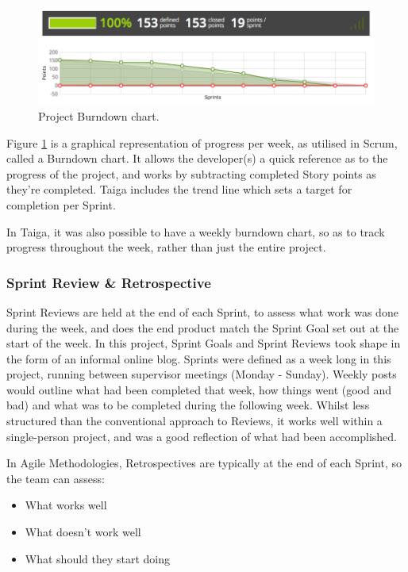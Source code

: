 \begin{figure}[H]
  \centering
  \includegraphics[width=\textwidth]{Chapter2/software-img/burndown.png}
  \caption{Project Burndown chart.}
  \label{fig:burndown}
\end{figure}

Figure \ref{fig:burndown} is a graphical representation of progress per week, as utilised in Scrum, called a Burndown chart. It allows the developer(s) a quick reference as to the progress of the project, and works by subtracting completed Story points as they're completed. Taiga includes the trend line which sets a target for completion per Sprint.

In Taiga, it was also possible to have a weekly burndown chart, so as to track progress throughout the week, rather than just the entire project.

\subsubsection{Sprint Review \& Retrospective}

Sprint Reviews are held at the end of each Sprint, to assess what work was done during the week, and does the end product match the Sprint Goal set out at the start of the week. In this project, Sprint Goals and Sprint Reviews took shape in the form of an informal online blog. Sprints were defined as a week long in this project, running between supervisor meetings (Monday - Sunday). Weekly posts would outline what had been completed that week, how things went (good and bad) and what was to be completed during the following week. Whilst less structured than the conventional approach to Reviews, it works well within a single-person project, and was a good reflection of what had been accomplished.

In Agile Methodologies, Retrospectives are typically at the end of each Sprint, so the team can assess:
\begin{itemize}
  \item What works well
  \item What doesn't work well
  \item What should they start doing
\end{itemize}


